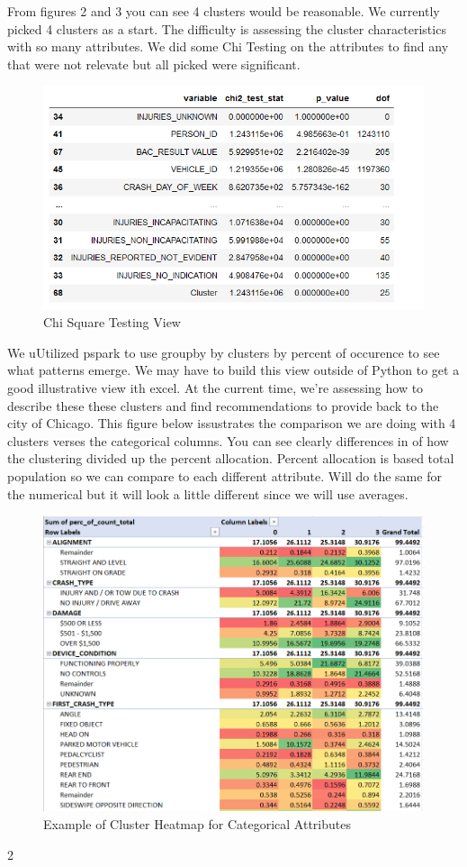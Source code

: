 \documentclass[conference]{IEEEtran}
\begin{document}
From figures 2 and 3 you can see 4 clusters would be reasonable.  We currently picked 4 clusters as a start. The difficulty is assessing the 
cluster characteristics with so many attributes.  We did some Chi Testing on the attributes to find any that were not relevate but all picked were significant.
\begin{figure}[!h]
	\includegraphics[width=\linewidth]{Chi Square.png}
	\caption{Chi Square Testing View}
	\label{table: Chi Square Testing View}
\end{figure}
We uUtilized pspark to use groupby by clusters by percent of occurence to see what patterns emerge.  We may have to build this view outside of Python to get a good illustrative view ith excel.  At the current time, we're assessing how to describe these these clusters and find recommendations to provide back to the city of Chicago. This figure below issustrates the comparison we are doing with 4 clusters verses the categorical columns.  You can see clearly differences in of how the clustering divided up the percent allocation. Percent allocation is based total population so we can compare to each different attribute.  Will do the same for the numerical but it will look a little different since we will use averages.
\begin{figure}[!h]
	\includegraphics[width=\linewidth]{KP_Percent_ALL.png}
	\caption{Example of Cluster Heatmap for Categorical Attributes }
	\label{fig: Example of Cluster Heatmap for Categorical Attributes (4 Clusters)}
\end{figure}
2
\end{document}
